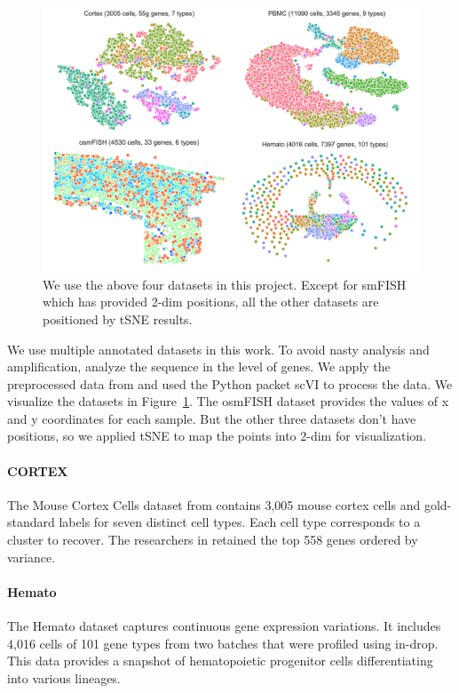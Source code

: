 \documentclass{bioinfo}
\begin{document}
\begin{figure}
\centering
  \includegraphics[width=\textwidth]{figure/scatter.png}
  \caption{We use the above four datasets in this project. Except for smFISH which has provided 2-dim positions, all the other datasets are positioned by tSNE results.}\label{scatter}
\end{figure}


We use multiple annotated datasets in this work. To avoid nasty analysis and amplification, analyze the sequence in the level of genes. We apply the preprocessed data from \citep{gen2018} and used the Python packet scVI \citep{gen2018,scvi2,scvi3,scvi4,scvi5} to process the data. We visualize the datasets in Figure~\ref{scatter}. The osmFISH dataset provides the values of x and y coordinates for each sample. But the other three datasets don't have positions, so we applied tSNE to map the points into 2-dim for visualization.


\paragraph{CORTEX}
The Mouse Cortex Cells dataset from \citep{cortex2015} contains 3,005 mouse cortex cells and gold-standard labels for seven distinct cell types. Each cell type corresponds to a cluster to recover. The researchers in \citep{gen2018} retained the top 558 genes ordered by variance.


\paragraph{Hemato}

The Hemato dataset\cite{hemato} captures continuous gene expression variations. It includes 4,016 cells of 101 gene types from two batches that were profiled using in-drop. This data provides a snapshot of hematopoietic progenitor cells differentiating into various lineages.
\end{document}
